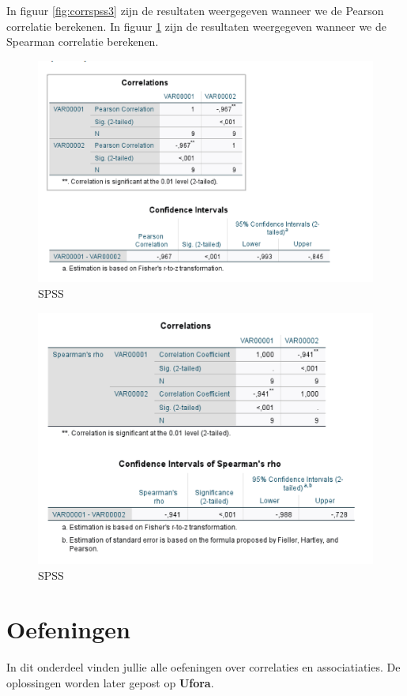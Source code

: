 \documentclass[
]{book}
\theoremstyle{definition}
\theoremstyle{definition}
\theoremstyle{definition}
\theoremstyle{definition}
\theoremstyle{remark}
\begin{document}
In figuur \ref{fig:corrspss3} zijn de resultaten weergegeven wanneer we de Pearson correlatie berekenen. In figuur \ref{fig:corrspss4} zijn de resultaten weergegeven wanneer we de Spearman correlatie berekenen.

\begin{figure}
\includegraphics[width=0.75\linewidth]{img/spss_corr_4} \caption{SPSS}\label{fig:corrspss4}
\end{figure}

\begin{figure}
\includegraphics[width=0.75\linewidth]{img/spss_corr_5} \caption{SPSS}\label{fig:corrspss5}
\end{figure}

\newpage

\hypertarget{oefeningen}{%
\section*{Oefeningen}\label{oefeningen}}


In dit onderdeel vinden jullie alle oefeningen over correlaties en associatiaties. De oplossingen worden later gepost op \textbf{Ufora}.
\end{document}

